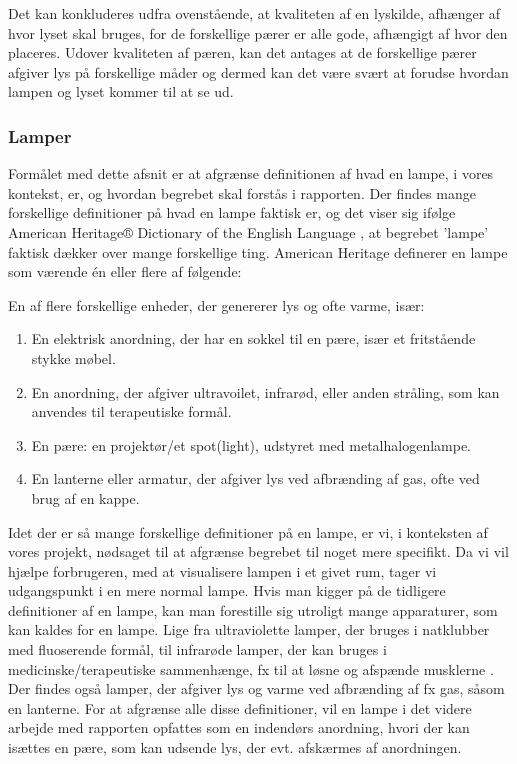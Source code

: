 Det kan konkluderes udfra ovenstående, at kvaliteten af en lyskilde, afhænger af hvor lyset skal bruges, for de forskellige pærer er alle gode, afhængigt af hvor den placeres. Udover kvaliteten af pæren, kan det antages at de forskellige pærer afgiver lys på forskellige måder og dermed kan det være svært at forudse hvordan lampen og lyset kommer til at se ud.  


\subsubsection{Lamper}
Formålet med dette afsnit er at afgrænse definitionen af hvad en lampe, i vores kontekst, er, og hvordan begrebet skal forstås i rapporten.
Der findes mange forskellige definitioner på hvad en lampe faktisk er, og det viser sig ifølge American Heritage® Dictionary of the English Language \cite{american_heritage}, at begrebet ’lampe’ faktisk dækker over mange forskellige ting. 
\newline American Heritage definerer en lampe som værende én eller flere af følgende:

En af flere forskellige enheder, der genererer lys og ofte varme, især:
\begin{enumerate}
    \item En elektrisk anordning, der har en sokkel til en pære, især et fritstående stykke møbel.
    \item En anordning, der afgiver ultravoilet, infrarød, eller anden stråling, som kan anvendes til terapeutiske formål.
    \item En pære: en projektør/et spot(light), udstyret med metalhalogenlampe.
    \item En lanterne eller armatur, der afgiver lys ved afbrænding af gas, ofte ved brug af en kappe.
\end{enumerate}

Idet der er så mange forskellige definitioner på en lampe, er vi, i konteksten af vores projekt, nødsaget til at afgrænse begrebet til noget mere specifikt. Da vi vil hjælpe forbrugeren, med at visualisere lampen i et givet rum, tager vi udgangspunkt i en mere normal lampe. Hvis man kigger på de tidligere definitioner af en lampe, kan man forestille sig utroligt mange apparaturer, som kan kaldes for en lampe. Lige fra ultraviolette lamper, der bruges i natklubber med fluoserende formål, til infrarøde lamper, der kan bruges i medicinske/terapeutiske sammenhænge, fx til at løsne og afspænde musklerne \cite{lys_terapi}. Der findes også lamper, der afgiver lys og varme ved afbrænding af fx gas, såsom en lanterne. For at afgrænse alle disse definitioner, vil en lampe i det videre arbejde med rapporten opfattes som en indendørs anordning, hvori der kan isættes en pære, som kan udsende lys, der evt. afskærmes af anordningen.

